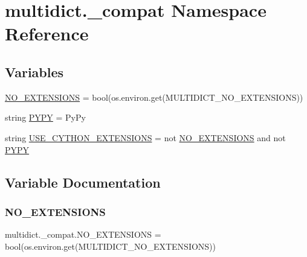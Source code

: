 \hypertarget{namespacemultidict_1_1__compat}{}\section{multidict.\+\_\+compat Namespace Reference}
\label{namespacemultidict_1_1__compat}
\subsection*{Variables}
\begin{DoxyCompactItemize}
\item 
\hyperlink{namespacemultidict_1_1__compat_a6270ea71751266d408fc9a8db5d825ef}{N\+O\+\_\+\+E\+X\+T\+E\+N\+S\+I\+O\+NS} = bool(os.\+environ.\+get(\textquotesingle{}M\+U\+L\+T\+I\+D\+I\+C\+T\+\_\+\+N\+O\+\_\+\+E\+X\+T\+E\+N\+S\+I\+O\+NS\textquotesingle{}))
\item 
string \hyperlink{namespacemultidict_1_1__compat_a883c66cc6a87e87be9e9c25843499405}{P\+Y\+PY} = \textquotesingle{}Py\+Py\textquotesingle{}
\item 
string \hyperlink{namespacemultidict_1_1__compat_aa5aa62d1444fd60c277b72ae3abe4cb5}{U\+S\+E\+\_\+\+C\+Y\+T\+H\+O\+N\+\_\+\+E\+X\+T\+E\+N\+S\+I\+O\+NS} = not \hyperlink{namespacemultidict_1_1__compat_a6270ea71751266d408fc9a8db5d825ef}{N\+O\+\_\+\+E\+X\+T\+E\+N\+S\+I\+O\+NS} and not \hyperlink{namespacemultidict_1_1__compat_a883c66cc6a87e87be9e9c25843499405}{P\+Y\+PY}
\end{DoxyCompactItemize}


\subsection{Variable Documentation}
\mbox{\label{namespacemultidict_1_1__compat_a6270ea71751266d408fc9a8db5d825ef}} 
\subsubsection{\texorpdfstring{N\+O\+\_\+\+E\+X\+T\+E\+N\+S\+I\+O\+NS}{NO\_EXTENSIONS}}
{\footnotesize\ttfamily multidict.\+\_\+compat.\+N\+O\+\_\+\+E\+X\+T\+E\+N\+S\+I\+O\+NS = bool(os.\+environ.\+get(\textquotesingle{}M\+U\+L\+T\+I\+D\+I\+C\+T\+\_\+\+N\+O\+\_\+\+E\+X\+T\+E\+N\+S\+I\+O\+NS\textquotesingle{}))}

